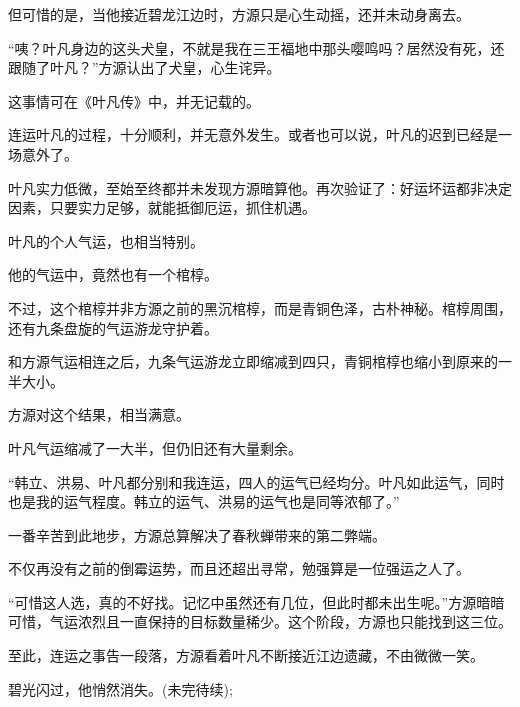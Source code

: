 \begin{this_body}
但可惜的是，当他接近碧龙江边时，方源只是心生动摇，还并未动身离去。

“咦？叶凡身边的这头犬皇，不就是我在三王福地中那头嘤鸣吗？居然没有死，还跟随了叶凡？”方源认出了犬皇，心生诧异。

这事情可在《叶凡传》中，并无记载的。

连运叶凡的过程，十分顺利，并无意外发生。或者也可以说，叶凡的迟到已经是一场意外了。

叶凡实力低微，至始至终都并未发现方源暗算他。再次验证了：好运坏运都非决定因素，只要实力足够，就能抵御厄运，抓住机遇。

叶凡的个人气运，也相当特别。

他的气运中，竟然也有一个棺椁。

不过，这个棺椁并非方源之前的黑沉棺椁，而是青铜色泽，古朴神秘。棺椁周围，还有九条盘旋的气运游龙守护着。

和方源气运相连之后，九条气运游龙立即缩减到四只，青铜棺椁也缩小到原来的一半大小。

方源对这个结果，相当满意。

叶凡气运缩减了一大半，但仍旧还有大量剩余。

“韩立、洪易、叶凡都分别和我连运，四人的运气已经均分。叶凡如此运气，同时也是我的运气程度。韩立的运气、洪易的运气也是同等浓郁了。”

一番辛苦到此地步，方源总算解决了春秋蝉带来的第二弊端。

不仅再没有之前的倒霉运势，而且还超出寻常，勉强算是一位强运之人了。

“可惜这人选，真的不好找。记忆中虽然还有几位，但此时都未出生呢。”方源暗暗可惜，气运浓烈且一直保持的目标数量稀少。这个阶段，方源也只能找到这三位。

至此，连运之事告一段落，方源看着叶凡不断接近江边遗藏，不由微微一笑。

碧光闪过，他悄然消失。(未完待续);

\end{this_body}

